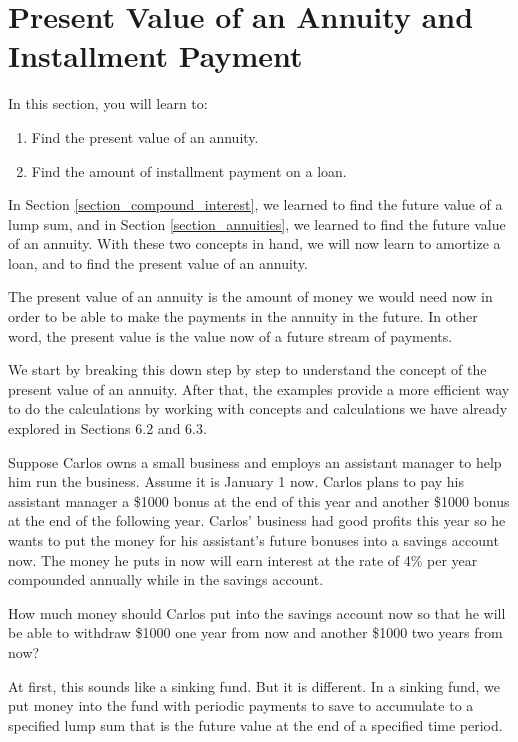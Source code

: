 \section{Present Value of an Annuity and Installment Payment}

In this section, you will learn to:
\begin{enumerate}
    \item Find the present value of an annuity.
    \item Find the amount of installment payment on a loan.
\end{enumerate}

In Section \ref{section_compound_interest}, we learned to find the future value of a lump sum, and in Section \ref{section_annuities}, we learned to find the future value of an annuity.  With these two concepts in hand, we will now learn to amortize a loan, and to find the present value of an annuity.

The present value of an annuity is the amount of money we would need now in order to be able to make the payments in the annuity in the future. In other word, the present value is the value now of a future stream of payments.

We start by breaking this down step by step to understand the concept of the present value of an annuity. After that, the examples provide a more efficient way to do the calculations by working with concepts and calculations we have already explored in Sections 6.2 and 6.3.

Suppose Carlos owns a small business and employs an assistant manager to help him run the business.  Assume it is January 1 now.  Carlos plans to pay his assistant manager a \$1000 bonus at the end of this year and another \$1000 bonus at the end of the following year. Carlos’ business had good profits this year so he wants to put the money for his assistant’s future bonuses into a savings account now.  The money he puts in now will earn interest at the rate of 4\% per year compounded annually while in the savings account.

How much money should Carlos put into the savings account now so that he will be able to withdraw \$1000 one year from now and another \$1000 two years from now?

At first, this sounds like a sinking fund.  But it is different.  In a sinking fund, we put money into the fund with periodic payments to save to accumulate to a specified lump sum that is the future value at the end of a specified time period.

